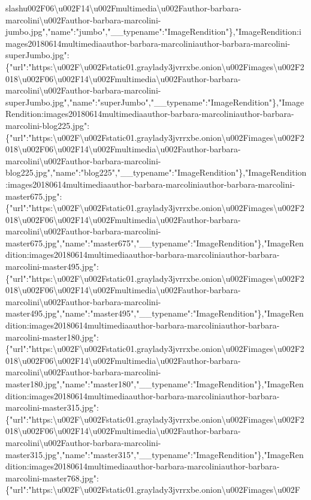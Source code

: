 slash{}u002F06\textbackslash{}u002F14\textbackslash{}u002Fmultimedia\textbackslash{}u002Fauthor-barbara-marcolini\textbackslash{}u002Fauthor-barbara-marcolini-jumbo.jpg","name":"jumbo","\_\_typename":"ImageRendition"\},"ImageRendition:images20180614multimediaauthor-barbara-marcoliniauthor-barbara-marcolini-superJumbo.jpg":\{"url":"https:\textbackslash{}u002F\textbackslash{}u002Fstatic01.graylady3jvrrxbe.onion\textbackslash{}u002Fimages\textbackslash{}u002F2018\textbackslash{}u002F06\textbackslash{}u002F14\textbackslash{}u002Fmultimedia\textbackslash{}u002Fauthor-barbara-marcolini\textbackslash{}u002Fauthor-barbara-marcolini-superJumbo.jpg","name":"superJumbo","\_\_typename":"ImageRendition"\},"ImageRendition:images20180614multimediaauthor-barbara-marcoliniauthor-barbara-marcolini-blog225.jpg":\{"url":"https:\textbackslash{}u002F\textbackslash{}u002Fstatic01.graylady3jvrrxbe.onion\textbackslash{}u002Fimages\textbackslash{}u002F2018\textbackslash{}u002F06\textbackslash{}u002F14\textbackslash{}u002Fmultimedia\textbackslash{}u002Fauthor-barbara-marcolini\textbackslash{}u002Fauthor-barbara-marcolini-blog225.jpg","name":"blog225","\_\_typename":"ImageRendition"\},"ImageRendition:images20180614multimediaauthor-barbara-marcoliniauthor-barbara-marcolini-master675.jpg":\{"url":"https:\textbackslash{}u002F\textbackslash{}u002Fstatic01.graylady3jvrrxbe.onion\textbackslash{}u002Fimages\textbackslash{}u002F2018\textbackslash{}u002F06\textbackslash{}u002F14\textbackslash{}u002Fmultimedia\textbackslash{}u002Fauthor-barbara-marcolini\textbackslash{}u002Fauthor-barbara-marcolini-master675.jpg","name":"master675","\_\_typename":"ImageRendition"\},"ImageRendition:images20180614multimediaauthor-barbara-marcoliniauthor-barbara-marcolini-master495.jpg":\{"url":"https:\textbackslash{}u002F\textbackslash{}u002Fstatic01.graylady3jvrrxbe.onion\textbackslash{}u002Fimages\textbackslash{}u002F2018\textbackslash{}u002F06\textbackslash{}u002F14\textbackslash{}u002Fmultimedia\textbackslash{}u002Fauthor-barbara-marcolini\textbackslash{}u002Fauthor-barbara-marcolini-master495.jpg","name":"master495","\_\_typename":"ImageRendition"\},"ImageRendition:images20180614multimediaauthor-barbara-marcoliniauthor-barbara-marcolini-master180.jpg":\{"url":"https:\textbackslash{}u002F\textbackslash{}u002Fstatic01.graylady3jvrrxbe.onion\textbackslash{}u002Fimages\textbackslash{}u002F2018\textbackslash{}u002F06\textbackslash{}u002F14\textbackslash{}u002Fmultimedia\textbackslash{}u002Fauthor-barbara-marcolini\textbackslash{}u002Fauthor-barbara-marcolini-master180.jpg","name":"master180","\_\_typename":"ImageRendition"\},"ImageRendition:images20180614multimediaauthor-barbara-marcoliniauthor-barbara-marcolini-master315.jpg":\{"url":"https:\textbackslash{}u002F\textbackslash{}u002Fstatic01.graylady3jvrrxbe.onion\textbackslash{}u002Fimages\textbackslash{}u002F2018\textbackslash{}u002F06\textbackslash{}u002F14\textbackslash{}u002Fmultimedia\textbackslash{}u002Fauthor-barbara-marcolini\textbackslash{}u002Fauthor-barbara-marcolini-master315.jpg","name":"master315","\_\_typename":"ImageRendition"\},"ImageRendition:images20180614multimediaauthor-barbara-marcoliniauthor-barbara-marcolini-master768.jpg":\{"url":"https:\textbackslash{}u002F\textbackslash{}u002Fstatic01.graylady3jvrrxbe.onion\textbackslash{}u002Fimages\textbackslash{}u002F